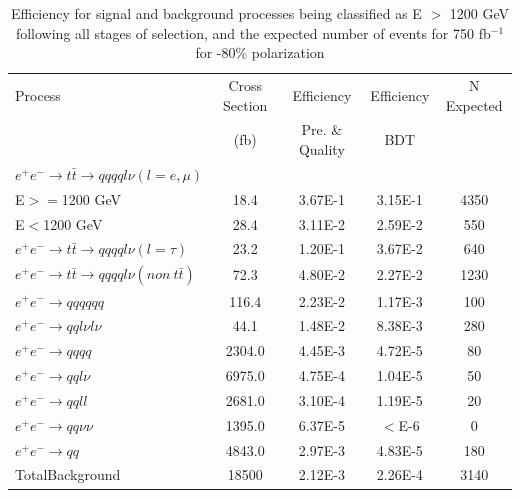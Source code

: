 \begin{table}
  \centering
  \begin{tabular}{l | c | c | c | c}
    \toprule
     Process     & Cross Section & Efficiency & Efficiency & N Expected\\
     & (fb) & Pre. \& Quality & BDT & \\
     \midrule
    $e^+e^-\rightarrow t\bar{t} \rightarrow qqqql\nu (l=e,\mu)$&  &  & &\\
     E$>=$1200 GeV & 18.4 & 3.67E-1 & 3.15E-1 & 4350\\
     E$<$1200 GeV & 28.4 & 3.11E-2 & 2.59E-2 & 550 \\
    \midrule
    $e^+e^-\rightarrow t\bar{t} \rightarrow qqqql\nu (l=\tau)$& 23.2 & 1.20E-1 & 3.67E-2 & 640 \\
    \midrule
    $e^+e^-\rightarrow t\bar{t} \rightarrow qqqql\nu (non ~ t\bar{t})$& 72.3 & 4.80E-2 & 2.27E-2 & 1230\\
    \midrule
    $e^+e^-\rightarrow qqqqqq$ & 116.4 &  2.23E-2 &1.17E-3 & 100 \\
    \midrule
    $e^+e^-\rightarrow qql\nu l\nu$ & 44.1 & 1.48E-2 & 8.38E-3 & 280\\
    \midrule
    $e^+e^-\rightarrow qqqq$ & 2304.0 & 4.45E-3 & 4.72E-5 & 80 \\
    \midrule
    $e^+e^-\rightarrow qql\nu$ & 6975.0 & 4.75E-4 & 1.04E-5 & 50 \\
    \midrule
    $e^+e^-\rightarrow qqll$ & 2681.0 & 3.10E-4 & 1.19E-5 & 20 \\
    \midrule
    $e^+e^-\rightarrow qq\nu\nu$ & 1395.0 & 6.37E-5 & $<$E-6 & 0 \\
    \midrule
    $e^+e^-\rightarrow qq$ & 4843.0 & 2.97E-3 & 4.83E-5 & 180\\
    \midrule
    \midrule
    TotalBackground & 18500 & 2.12E-3 & 2.26E-4 & 3140 \\
    \bottomrule
  \end{tabular}
  \caption{Efficiency for signal and background processes being classified as E $>$ 1200 GeV following all stages of selection, and the expected number of events for 750 fb$^{-1}$ for -80\% polarization}
  \label{table:topfinalefficienciesneg}
\end{table}

